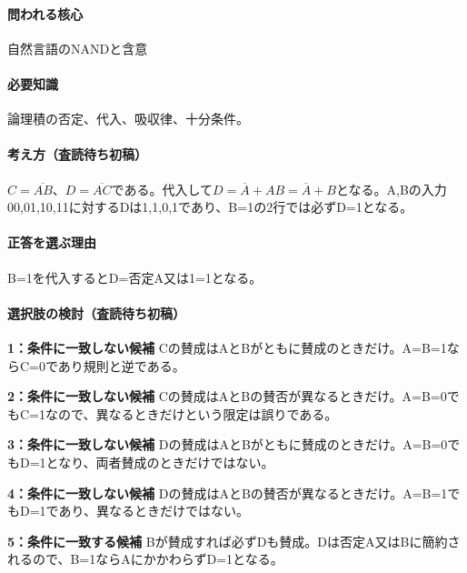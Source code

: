 \paragraph{問われる核心} 自然言語のNANDと含意

\paragraph{必要知識} 論理積の否定、代入、吸収律、十分条件。

\paragraph{考え方（査読待ち初稿）} \(C=\overline{AB}\)、\(D=\overline{AC}\)である。代入して\(D=\overline A+AB=\overline A+B\)となる。A,Bの入力00,01,10,11に対するDは1,1,0,1であり、B=\allowbreak{}1の2行では必ずD=\allowbreak{}1となる。

\paragraph{正答を選ぶ理由} B=\allowbreak{}1を代入するとD=否定A又は1=\allowbreak{}1となる。

\paragraph{選択肢の検討（査読待ち初稿）}\mbox{}\par

\noindent\textbf{1：条件に一致しない候補} Cの賛成はAとBがともに賛成のときだけ。A=\allowbreak{}B=\allowbreak{}1ならC=\allowbreak{}0であり規則と逆である。\par

\noindent\textbf{2：条件に一致しない候補} Cの賛成はAとBの賛否が異なるときだけ。A=\allowbreak{}B=\allowbreak{}0でもC=\allowbreak{}1なので、異なるときだけという限定は誤りである。\par

\noindent\textbf{3：条件に一致しない候補} Dの賛成はAとBがともに賛成のときだけ。A=\allowbreak{}B=\allowbreak{}0でもD=\allowbreak{}1となり、両者賛成のときだけではない。\par

\noindent\textbf{4：条件に一致しない候補} Dの賛成はAとBの賛否が異なるときだけ。A=\allowbreak{}B=\allowbreak{}1でもD=\allowbreak{}1であり、異なるときだけではない。\par

\noindent\textbf{5：条件に一致する候補} Bが賛成すれば必ずDも賛成。Dは否定A又はBに簡約されるので、B=\allowbreak{}1ならAにかかわらずD=\allowbreak{}1となる。\par

